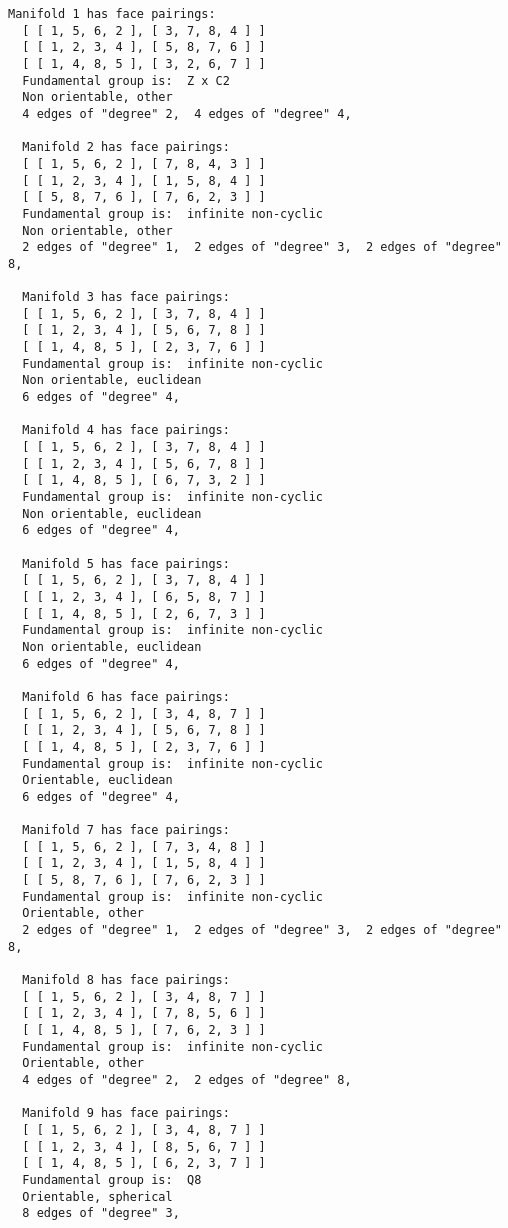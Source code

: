 \documentclass[a4paper,11pt]{report}
\begin{document}
{{{\begin{Verbatim}[commandchars=@|A,fontsize=\small,frame=single,label=Example]
  Manifold 1 has face pairings:
  [ [ 1, 5, 6, 2 ], [ 3, 7, 8, 4 ] ]
  [ [ 1, 2, 3, 4 ], [ 5, 8, 7, 6 ] ]
  [ [ 1, 4, 8, 5 ], [ 3, 2, 6, 7 ] ]
  Fundamental group is:  Z x C2
  Non orientable, other
  4 edges of "degree" 2,  4 edges of "degree" 4,  
  
  Manifold 2 has face pairings:
  [ [ 1, 5, 6, 2 ], [ 7, 8, 4, 3 ] ]
  [ [ 1, 2, 3, 4 ], [ 1, 5, 8, 4 ] ]
  [ [ 5, 8, 7, 6 ], [ 7, 6, 2, 3 ] ]
  Fundamental group is:  infinite non-cyclic
  Non orientable, other
  2 edges of "degree" 1,  2 edges of "degree" 3,  2 edges of "degree" 8,  
  
  Manifold 3 has face pairings:
  [ [ 1, 5, 6, 2 ], [ 3, 7, 8, 4 ] ]
  [ [ 1, 2, 3, 4 ], [ 5, 6, 7, 8 ] ]
  [ [ 1, 4, 8, 5 ], [ 2, 3, 7, 6 ] ]
  Fundamental group is:  infinite non-cyclic
  Non orientable, euclidean
  6 edges of "degree" 4,  
  
  Manifold 4 has face pairings:
  [ [ 1, 5, 6, 2 ], [ 3, 7, 8, 4 ] ]
  [ [ 1, 2, 3, 4 ], [ 5, 6, 7, 8 ] ]
  [ [ 1, 4, 8, 5 ], [ 6, 7, 3, 2 ] ]
  Fundamental group is:  infinite non-cyclic
  Non orientable, euclidean
  6 edges of "degree" 4,  
  
  Manifold 5 has face pairings:
  [ [ 1, 5, 6, 2 ], [ 3, 7, 8, 4 ] ]
  [ [ 1, 2, 3, 4 ], [ 6, 5, 8, 7 ] ]
  [ [ 1, 4, 8, 5 ], [ 2, 6, 7, 3 ] ]
  Fundamental group is:  infinite non-cyclic
  Non orientable, euclidean
  6 edges of "degree" 4,  
  
  Manifold 6 has face pairings:
  [ [ 1, 5, 6, 2 ], [ 3, 4, 8, 7 ] ]
  [ [ 1, 2, 3, 4 ], [ 5, 6, 7, 8 ] ]
  [ [ 1, 4, 8, 5 ], [ 2, 3, 7, 6 ] ]
  Fundamental group is:  infinite non-cyclic
  Orientable, euclidean
  6 edges of "degree" 4,  
  
  Manifold 7 has face pairings:
  [ [ 1, 5, 6, 2 ], [ 7, 3, 4, 8 ] ]
  [ [ 1, 2, 3, 4 ], [ 1, 5, 8, 4 ] ]
  [ [ 5, 8, 7, 6 ], [ 7, 6, 2, 3 ] ]
  Fundamental group is:  infinite non-cyclic
  Orientable, other
  2 edges of "degree" 1,  2 edges of "degree" 3,  2 edges of "degree" 8,  
  
  Manifold 8 has face pairings:
  [ [ 1, 5, 6, 2 ], [ 3, 4, 8, 7 ] ]
  [ [ 1, 2, 3, 4 ], [ 7, 8, 5, 6 ] ]
  [ [ 1, 4, 8, 5 ], [ 7, 6, 2, 3 ] ]
  Fundamental group is:  infinite non-cyclic
  Orientable, other
  4 edges of "degree" 2,  2 edges of "degree" 8,  
  
  Manifold 9 has face pairings:
  [ [ 1, 5, 6, 2 ], [ 3, 4, 8, 7 ] ]
  [ [ 1, 2, 3, 4 ], [ 8, 5, 6, 7 ] ]
  [ [ 1, 4, 8, 5 ], [ 6, 2, 3, 7 ] ]
  Fundamental group is:  Q8
  Orientable, spherical
  8 edges of "degree" 3,  
  

\end{Verbatim}}}}
\end{document}
